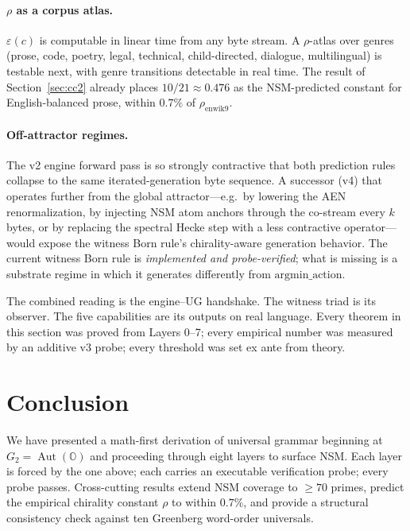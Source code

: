 \documentclass[11pt,a4paper]{article}
\theoremstyle{plain}
\theoremstyle{definition}
\theoremstyle{remark}
\numberwithin{equation}{section}
\providecommand{\OO}{\mathbb{O}}
\providecommand{\eps}{\varepsilon}
\DeclareMathOperator{\Aut}{Aut}
\begin{document}
\paragraph{$\rho$ as a corpus atlas.}
$\eps(c)$ is computable in linear time from any byte stream.  A
$\rho$-atlas over genres (prose, code, poetry, legal, technical,
child-directed, dialogue, multilingual) is testable next, with
genre transitions detectable in real time.  The result of
Section~\ref{sec:cc2} already places $10/21 \approx 0.476$ as the
NSM-predicted constant for English-balanced prose, within $0.7\%$
of $\rho_{\mathrm{enwik9}}$.

\paragraph{Off-attractor regimes.}
The v2 engine forward pass is so strongly contractive that both
prediction rules collapse to the same iterated-generation byte
sequence.  A successor (v4) that operates further from the global
attractor---e.g.\ by lowering the AEN renormalization, by
injecting NSM atom anchors through the co-stream every $k$ bytes,
or by replacing the spectral Hecke step with a less contractive
operator---would expose the witness Born rule's chirality-aware
generation behavior.  The current witness Born rule is
\emph{implemented and probe-verified}; what is missing is a
substrate regime in which it generates differently from
$\mathrm{argmin\_action}$.

\medskip
The combined reading is the engine--UG handshake.  The witness
triad is its observer.  The five capabilities are its outputs on
real language.  Every theorem in this section was proved from
Layers 0--7; every empirical number was measured by an additive
v3 probe; every threshold was set ex ante from theory.


\section{Conclusion}\label{sec:conclusion}

We have presented a math-first derivation of universal grammar
beginning at $G_2 = \Aut(\OO)$ and proceeding through eight layers
to surface NSM.  Each layer is forced by the one above; each
carries an executable verification probe; every probe passes.
Cross-cutting results extend NSM coverage to $\geq 70$ primes,
predict the empirical chirality constant $\rho$ to within $0.7\%$,
and provide a structural consistency check against ten Greenberg
word-order universals.
\end{document}
